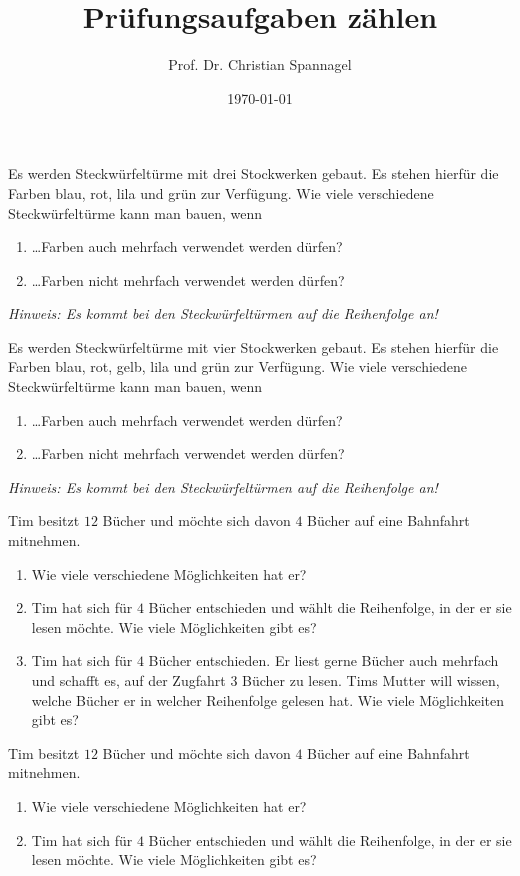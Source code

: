 \documentclass{cssheet}
\title{Prüfungsaufgaben zählen}
\author{Prof. Dr. Christian Spannagel}
\date{\today}
\begin{document}
\printtitle


\begin{aufgabe}[SoSe 17, HT]
	Es werden Steckwürfeltürme mit drei Stockwerken gebaut. Es stehen hierfür die Farben blau, rot, lila und grün zur Verfügung. Wie viele verschiedene Steckwürfeltürme kann man bauen, wenn
	\begin{enumerate}
		\item \dots Farben auch mehrfach verwendet werden dürfen?
		\item \dots Farben nicht mehrfach verwendet werden dürfen?
	\end{enumerate}
	
	\textit{Hinweis: Es kommt bei den Steckwürfeltürmen auf die Reihenfolge an!}
\end{aufgabe}

\begin{aufgabe}[SoSe 17, NT]
	Es werden Steckwürfeltürme mit vier Stockwerken gebaut. Es stehen hierfür die Farben blau, rot, gelb, lila und grün zur Verfügung. Wie viele verschiedene Steckwürfeltürme kann man bauen, wenn
	\begin{enumerate}
		\item \dots Farben auch mehrfach verwendet werden dürfen?
		\item \dots Farben nicht mehrfach verwendet werden dürfen?
	\end{enumerate}
	
	\textit{Hinweis: Es kommt bei den Steckwürfeltürmen auf die Reihenfolge an!}
\end{aufgabe}

\begin{aufgabe}[SoSe 22]
	Tim besitzt $12$ Bücher und möchte sich davon $4$ Bücher auf eine Bahnfahrt mitnehmen.
	\begin{enumerate}
		\item Wie viele verschiedene Möglichkeiten hat er?
		\item Tim hat sich für $4$ Bücher entschieden und wählt die Reihenfolge, in der er sie lesen möchte. Wie viele Möglichkeiten gibt es?
		\item Tim hat sich für $4$ Bücher entschieden. Er liest gerne Bücher auch mehrfach und schafft es, auf der Zugfahrt $3$ Bücher zu lesen. Tims Mutter will wissen, welche Bücher er in welcher Reihenfolge gelesen hat. Wie viele Möglichkeiten gibt es?
	\end{enumerate}
\end{aufgabe}

\begin{aufgabe}[SoSe 22]
	Tim besitzt $12$ Bücher und möchte sich davon $4$ Bücher auf eine Bahnfahrt mitnehmen.
	\begin{enumerate}
		\item Wie viele verschiedene Möglichkeiten hat er?
		\item Tim hat sich für $4$ Bücher entschieden und wählt die Reihenfolge, in der er sie lesen möchte. Wie viele Möglichkeiten gibt es?
	\end{enumerate}
\end{aufgabe}
\end{document}

